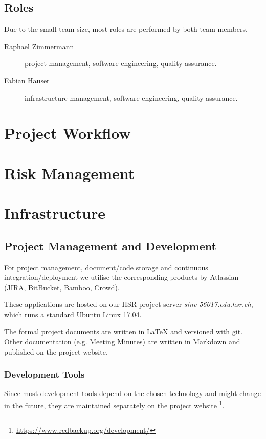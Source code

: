 \documentclass[a4paper]{article}
\begin{document}
\subsection{Roles}

Due to the small team size, most roles are performed by both team members.

\begin{description}
	\item[Raphael Zimmermann] project management, software engineering, quality assurance.
	\item[Fabian Hauser] infrastructure management, software engineering, quality assurance.
\end{description}

\section{Project Workflow}


\section{Risk Management}

\section{Infrastructure}


\subsection{Project Management and Development}

For project management, document/code storage and continuous integration/deployment we utilise the corresponding products by Atlassian (JIRA, BitBucket, Bamboo, Crowd)\cite{atlassian-opensource}.

These applications are hosted on our HSR project server \textit{sinv-56017.edu.hsr.ch}, which runs a standard Ubuntu Linux 17.04.

The formal project documents are written in LaTeX and versioned with git. Other documentation (e.g. Meeting Minutes) are written in Markdown and published on the project website.

\subsubsection{Development Tools}

Since most development tools depend on the chosen technology and might change in the future, they are maintained separately on the project website \footnote{\url{https://www.redbackup.org/development/}}.
\end{document}
